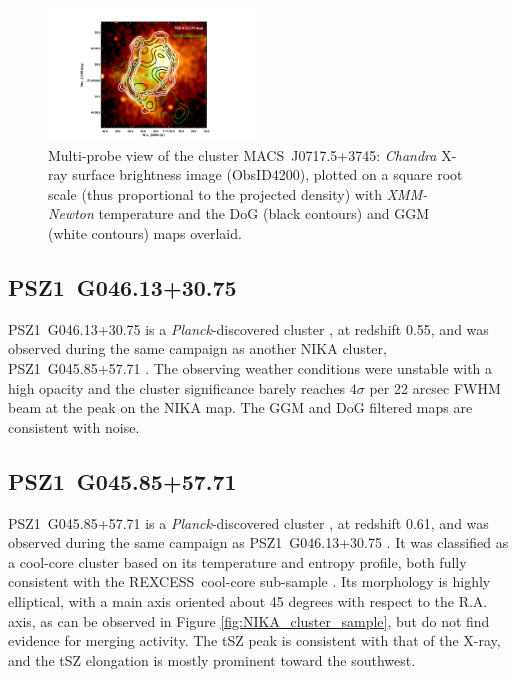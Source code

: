 \documentclass[twocolumn,traditabstract]{aa}
\newcommand{\rexcess}{{\gwpfont REXCESS}}
\begin{document}
\begin{figure}[h]
\center
\includegraphics[trim=5cm 0cm 8cm 2cm, clip=true, width=0.5\textwidth]{Figure/MACSJ0717_multiL.pdf} 
\caption{\footnotesize{Multi-probe view of the cluster \mbox{MACS~J0717.5+3745}: \textit{Chandra} X-ray surface brightness image (ObsID4200), plotted on a square root scale (thus proportional to the projected density) with \textit{XMM-Newton} temperature \citep[red contours from][]{Adam2017} and the DoG (black contours) and GGM (white contours) maps overlaid.}}
\label{fig:MACSJ0717_multiL}
\end{figure}

\subsection{PSZ1~G046.13+30.75}
\mbox{PSZ1~G046.13+30.75} is a \textit{Planck}-discovered cluster \citep{PlanckXXIX2014}, at redshift 0.55, and was observed during the same campaign as another NIKA cluster, \mbox{PSZ1~G045.85+57.71} \citep[see][for more details]{Ruppin2016}. The observing weather conditions were unstable with a high opacity and the cluster significance barely reaches $4 \sigma$ per 22 arcsec FWHM beam at the peak on the NIKA map. The GGM and DoG filtered maps are consistent with noise.

\subsection{PSZ1~G045.85+57.71}
\mbox{PSZ1~G045.85+57.71} is a \textit{Planck}-discovered cluster \citep{PlanckXXIX2014}, at redshift 0.61, and was observed during the same campaign as \mbox{PSZ1~G046.13+30.75} \citep[see][for more details]{Ruppin2016}. It was classified as a cool-core cluster based on its temperature and entropy profile, both fully consistent with the \rexcess\ cool-core sub-sample \citep{Bohringer2007,Arnaud2010,Pratt2010}. Its morphology is highly elliptical, with a main axis oriented about 45 degrees with respect to the R.A. axis, as can be observed in Figure \ref{fig:NIKA_cluster_sample}, but \cite{Ruppin2016} do not find evidence for merging activity. The tSZ peak is consistent with that of the X-ray, and the tSZ elongation is mostly prominent toward the southwest.
\end{document}
